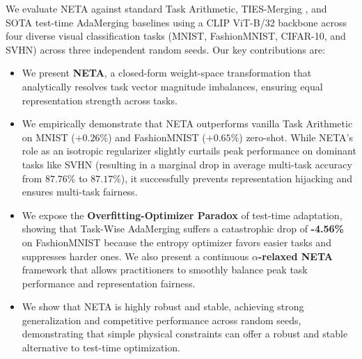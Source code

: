 We evaluate NETA against standard Task Arithmetic, TIES-Merging \cite{yadav2023resolving}, and SOTA test-time AdaMerging baselines using a CLIP ViT-B/32 backbone across four diverse visual classification tasks (MNIST, FashionMNIST, CIFAR-10, and SVHN) across three independent random seeds. Our key contributions are:
\begin{itemize}
    \item We present \textbf{NETA}, a closed-form weight-space transformation that analytically resolves task vector magnitude imbalances, ensuring equal representation strength across tasks.
    \item We empirically demonstrate that NETA outperforms vanilla Task Arithmetic on MNIST ($+0.26\%$) and FashionMNIST ($+0.65\%$) zero-shot. While NETA's role as an isotropic regularizer slightly curtails peak performance on dominant tasks like SVHN (resulting in a marginal drop in average multi-task accuracy from $87.76\%$ to $87.17\%$), it successfully prevents representation hijacking and ensures multi-task fairness.
    \item We expose the \textbf{Overfitting-Optimizer Paradox} of test-time adaptation, showing that Task-Wise AdaMerging suffers a catastrophic drop of \textbf{-4.56\%} on FashionMNIST because the entropy optimizer favors easier tasks and suppresses harder ones. We also present a continuous \textbf{$\alpha$-relaxed NETA} framework that allows practitioners to smoothly balance peak task performance and representation fairness.
    \item We show that NETA is highly robust and stable, achieving strong generalization and competitive performance across random seeds, demonstrating that simple physical constraints can offer a robust and stable alternative to test-time optimization.
\end{itemize}
